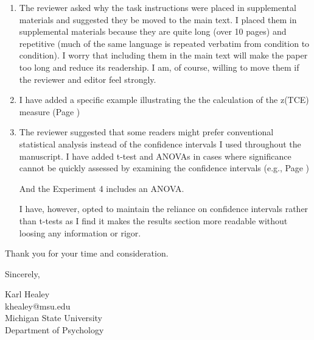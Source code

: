 \documentclass[12pt]{article}
\begin{document}
\begin{enumerate}
	\item
	The reviewer asked why the task instructions were placed in supplemental materials and suggested they be moved to the main text. I placed them in supplemental materials because they are quite long (over 10 pages) and repetitive (much of the same language is repeated verbatim from condition to condition). I worry that including them in the main text will make the paper too long and reduce its readership. I am, of course, willing to move them if the reviewer and editor feel strongly.

	\item
	I have added a specific example illustrating the the calculation of the z(TCE) measure  (Page \pageref{TODO-15})

	\item
	The reviewer suggested that some readers might prefer conventional statistical analysis instead of the confidence intervals I used throughout the manuscript. I have added t-test and ANOVAs in cases where significance cannot be quickly assessed by examining the confidence intervals (e.g., Page \pageref{t1})

	And the Experiment 4 includes an ANOVA.

	I have, however, opted to maintain the reliance on confidence intervals rather than t-tests as I find it makes the results section more readable without loosing any information or rigor. 



	

\end{enumerate}





\vspace{20pt}

Thank you for your time and consideration.

\vspace{10pt}

Sincerely,

\vspace{10pt}

Karl Healey\\
khealey@msu.edu\\
Michigan State University\\
Department of Psychology

%
\end{document}
